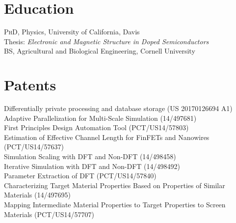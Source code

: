 \documentclass[11pt, a4paper]{article}
\newcommand{\years}[1]{\marginnote{\scriptsize #1}}
\begin{document}
{%
\section*{{\color{mycolor4}\textbf{Education}}}
\noindent
\years{2011}\textsc{PhD}, Physics, University of California, Davis\\
\indent Thesis: \textit{Electronic and Magnetic Structure in Doped Semiconductors}\\
\years{2004}\textsc{BS}, Agricultural and Biological Engineering, Cornell University\\




\section*{{\color{mycolor4}\textbf{Patents}}}
\noindent
Differentially private processing and database storage (US 20170126694 A1) \\
Adaptive Parallelization for Multi-Scale Simulation (14/497681) \\
First Principles Design Automation Tool (PCT/US14/57803) \\
Estimation of Effective Channel Length for FinFETs and Nanowires (PCT/US14/57637) \\
Simulation Scaling with DFT and Non-DFT (14/498458) \\
Iterative Simulation with DFT and Non-DFT (14/498492) \\
Parameter Extraction of DFT (PCT/US14/57840) \\
Characterizing Target Material Properties Based on Properties of Similar Materials (14/497695) \\
Mapping Intermediate Material Properties to Target Properties to Screen Materials (PCT/US14/57707)\\

}
\end{document}
